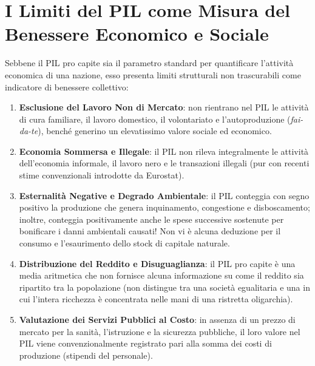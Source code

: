 \section{I Limiti del PIL come Misura del Benessere Economico e Sociale}

Sebbene il PIL pro capite sia il parametro standard per quantificare l'attività economica di una nazione, esso presenta limiti strutturali non trascurabili come indicatore di benessere collettivo:

\begin{enumerate}
    \item \textbf{Esclusione del Lavoro Non di Mercato}: non rientrano nel PIL le attività di cura familiare, il lavoro domestico, il volontariato e l'autoproduzione (\textit{fai-da-te}), benché generino un elevatissimo valore sociale ed economico.
    \item \textbf{Economia Sommersa e Illegale}: il PIL non rileva integralmente le attività dell'economia informale, il lavoro nero e le transazioni illegali (pur con recenti stime convenzionali introdotte da Eurostat).
    \item \textbf{Esternalità Negative e Degrado Ambientale}: il PIL conteggia con segno positivo la produzione che genera inquinamento, congestione e disboscamento; inoltre, conteggia positivamente anche le spese successive sostenute per bonificare i danni ambientali causati! Non vi è alcuna deduzione per il consumo e l'esaurimento dello stock di capitale naturale.
    \item \textbf{Distribuzione del Reddito e Disuguaglianza}: il PIL pro capite è una media aritmetica che non fornisce alcuna informazione su come il reddito sia ripartito tra la popolazione (non distingue tra una società egualitaria e una in cui l'intera ricchezza è concentrata nelle mani di una ristretta oligarchia).
    \item \textbf{Valutazione dei Servizi Pubblici al Costo}: in assenza di un prezzo di mercato per la sanità, l'istruzione e la sicurezza pubbliche, il loro valore nel PIL viene convenzionalmente registrato pari alla somma dei costi di produzione (stipendi del personale).
\end{enumerate}

